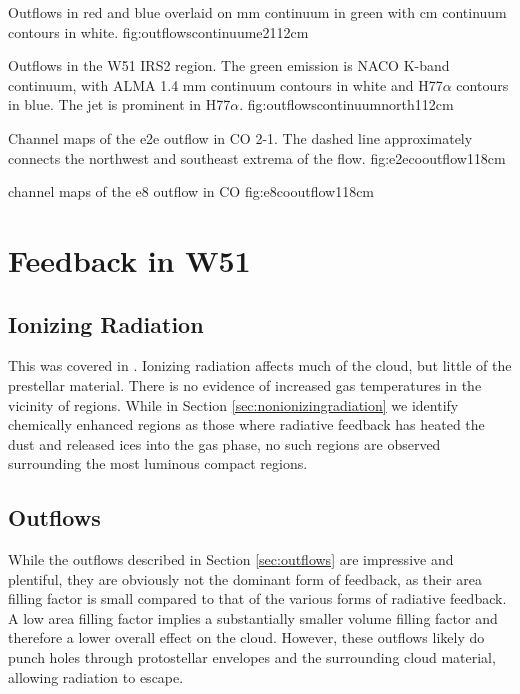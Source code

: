\documentclass{aa}
\begin{document}
{Outflows in red and blue overlaid on mm continuum in green with cm continuum contours in white.}
{fig:outflowscontinuume2}{1}{12cm}

{Outflows in the W51 IRS2 region.  The green emission is NACO K-band continuum,
with ALMA 1.4 mm continuum contours in white and H77$\alpha$ contours in blue.
The \citet{Lacy2007a} jet is prominent in H77$\alpha$.}
{fig:outflowscontinuumnorth}{1}{12cm}

{Channel maps of the e2e outflow in CO 2-1.  The dashed line approximately
connects the northwest and southeast extrema of the flow.}
{fig:e2ecooutflow}{1}{18cm}

{channel maps of the e8 outflow in CO}
{fig:e8cooutflow}{1}{18cm}

\section{Feedback in W51}
\subsection{Ionizing Radiation}
This was covered in \citep{Ginsburg2016b}.  Ionizing radiation affects much
of the cloud, but little of the prestellar material.  There is no evidence
of increased gas temperatures in the vicinity of \hii regions.  While in
Section \ref{sec:nonionizingradiation} we identify chemically enhanced
regions as those where radiative feedback has heated the dust and released
ices into the gas phase, no such regions are observed surrounding the most
luminous compact \hii regions.


\subsection{Outflows}
While the outflows described in Section \ref{sec:outflows} are impressive and
plentiful, they are obviously not the dominant form of feedback, as their area
filling factor is small compared to that of the various forms of radiative
feedback.  A low area filling factor implies a substantially smaller volume
filling factor and therefore a lower overall effect on the cloud.  However,
these outflows likely do punch holes through protostellar envelopes and the
surrounding cloud material, allowing radiation to escape.
\end{document}
